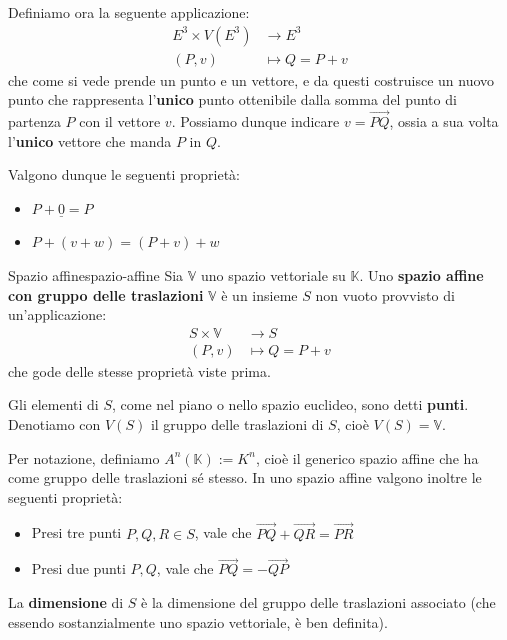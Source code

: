 \documentclass[12pt]{report}
\newcommand{\K}{\mathbb{K}}
\newcommand{\V}{\mathbb{V}}
\newcommand{\nullvector}{\underline{0}}
\begin{document}
	Definiamo ora la seguente applicazione:
	\[
		\begin{aligned}
			E^3 \times V(E^3) &\to E^3\\
			(P, v) &\mapsto Q = P + v
		\end{aligned}
	\]
	che come si vede prende un punto e un vettore, e da questi costruisce un nuovo punto che rappresenta l'\textbf{unico} punto ottenibile dalla somma del punto di partenza $P$ con il vettore $v$.
	Possiamo dunque indicare $v = \overrightarrow{PQ}$, ossia a sua volta l'\textbf{unico} vettore che manda $P$ in $Q$.
	
	Valgono dunque le seguenti proprietà:
	\begin{itemize}
		\item $P + \nullvector = P$
		\item $P + (v + w) = (P + v) + w$
	\end{itemize}
	
	\begin{definizione}{Spazio affine}{spazio-affine}
		Sia $\V$ uno spazio vettoriale su $\K$. Uno \textbf{spazio affine con gruppo delle traslazioni} $\V$ è un insieme $S$ non vuoto provvisto di un'applicazione:
		\[
			\begin{aligned}
				S \times \V &\to S\\
				(P, v) &\mapsto Q = P + v
			\end{aligned}
		\]
		che gode delle stesse proprietà viste prima.
	\end{definizione}
	
	Gli elementi di $S$, come nel piano o nello spazio euclideo, sono detti \textbf{punti}. Denotiamo con $V(S)$ il gruppo delle traslazioni di $S$, cioè $V(S) = \V$.
	
	Per notazione, definiamo $A^n(\K) := K^n$, cioè il generico spazio affine che ha come gruppo delle traslazioni sé stesso.
	In uno spazio affine valgono inoltre le seguenti proprietà:
	\begin{itemize}
		\item Presi tre punti $P, Q, R \in S$, vale che $\overrightarrow{PQ} + \overrightarrow{QR} = \overrightarrow{PR}$
		\item Presi due punti $P, Q$, vale che $\overrightarrow{PQ} = -\overrightarrow{QP}$
	\end{itemize}
	
	\begin{proposizione}{}{}
		La \textbf{dimensione} di $S$ è la dimensione del gruppo delle traslazioni associato (che essendo sostanzialmente uno spazio vettoriale, è ben definita).
	\end{proposizione}
	
\end{document}
